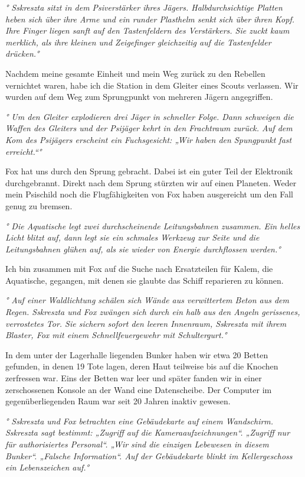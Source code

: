 \documentclass[11pt]{article}
\begin{document}
\emph{° Sskreszta sitzt in dem Psiverstärker ihres Jägers.
Halbdurchsichtige Platten heben sich über ihre Arme und ein runder
Plasthelm senkt sich über ihren Kopf. Ihre Finger liegen sanft auf den
Tastenfeldern des Verstärkers. Sie zuckt kaum merklich, als ihre kleinen
und Zeigefinger gleichzeitig auf die Tastenfelder drücken.°}

Nachdem meine gesamte Einheit und mein Weg zurück zu den Rebellen
vernichtet waren, habe ich die Station in dem Gleiter eines Scouts
verlassen. Wir wurden auf dem Weg zum Sprungpunkt von mehreren Jägern
angegriffen.

\emph{° Um den Gleiter explodieren drei Jäger in schneller Folge. Dann
schweigen die Waffen des Gleiters und der Psijäger kehrt in den
Frachtraum zurück. Auf dem Kom des Psijägers erscheint ein Fuchsgesicht:
„Wir haben den Spungpunkt fast erreicht.``°}

Fox hat uns durch den Sprung gebracht. Dabei ist ein guter Teil der
Elektronik durchgebrannt. Direkt nach dem Sprung stürzten wir auf einen
Planeten. Weder mein Psischild noch die Flugfähigkeiten von Fox haben
ausgereicht um den Fall genug zu bremsen.

\emph{° Die Aquatische legt zwei durchscheinende Leitungsbahnen
zusammen. Ein helles Licht blitzt auf, dann legt sie ein schmales
Werkzeug zur Seite und die Leitungsbahnen glühen auf, als sie wieder von
Energie durchflossen werden.°}

Ich bin zusammen mit Fox auf die Suche nach Ersatzteilen für Kalem, die
Aquatische, gegangen, mit denen sie glaubte das Schiff reparieren zu
können.

\emph{° Auf einer Waldlichtung schälen sich Wände aus verwittertem Beton
aus dem Regen. Sskreszta und Fox zwängen sich durch ein halb aus den
Angeln gerissenes, verrostetes Tor. Sie sichern sofort den leeren
Innenraum, Sskreszta mit ihrem Blaster, Fox mit einem Schnellfeuergewehr
mit Schultergurt.°}

In dem unter der Lagerhalle liegenden Bunker haben wir etwa 20 Betten
gefunden, in denen 19 Tote lagen, deren Haut teilweise bis auf die
Knochen zerfressen war. Eins der Betten war leer und später fanden wir
in einer zerschossenen Konsole an der Wand eine Datenscheibe. Der
Computer im gegenüberliegenden Raum war seit 20 Jahren inaktiv gewesen.

\emph{° Sskreszta und Fox betrachten eine Gebäudekarte auf einem
Wandschirm. Sskreszta sagt bestimmt: „Zugriff auf die
Kameraaufzeichnungen``. „Zugriff nur für authorisiertes Personal``. „Wir
sind die einzigen Lebewesen in diesem Bunker``. „Falsche Information``.
Auf der Gebäudekarte blinkt im Kellergeschoss ein Lebenszeichen auf.°}
\end{document}
